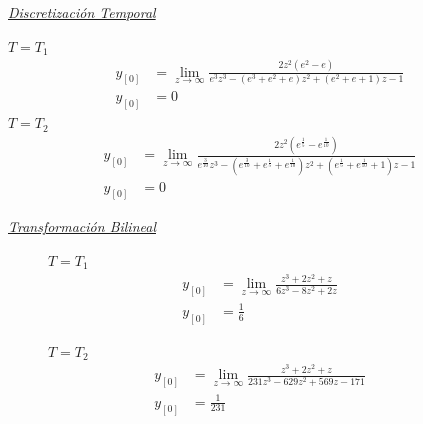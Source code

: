 \documentclass[a4paper,12pt]{report}
\begin{document}
\begin{enumerate}[label=\alph*), left=0pt]
                {\centering\underline{\textit{Discretización Temporal}}\par}
                $T = T_1$
                \begin{align*}
                    y_{[0]} &= \lim_{z \to \infty} \frac{2 z^2  (e^2 - e)}{e^3z^3-(e^3+e^2+e)z^2+(e^2+e+1)z-1}\\
                    y_{[0]} &= 0
                \end{align*}
                $T = T_2$
                \begin{align*}
                    y_{[0]} &= \lim_{z \to \infty} \frac{2 z^2 (e^{\frac{1}{5}} - e^{\frac{1}{10}})}
                        {e^{\frac{3}{10}}z^3 - (e^{\frac{3}{10}} + e^{\frac{1}{5}} + e^{\frac{1}{10}})z^2
                        + (e^{\frac{1}{5}} + e^{\frac{1}{10}} + 1)z - 1}\\
                    y_{[0]} &= 0
                \end{align*}

                {\centering\underline{\textit{Transformación Bilineal}}\par}
                \begin{figure}[h!]
                    \centering
                    \begin{minipage}{0.4\textwidth}
                        \centering
                        $T = T_1$
                        \begin{align*}
                            y_{[0]} &= \lim_{z \to \infty} \frac{z^3 + 2z^2 + z}{6z^3 - 8z^2 + 2z}\\
                            y_{[0]} &= \frac{1}{6}
                        \end{align*}
                    \end{minipage}
                    \hspace{0.5cm}
                    \begin{minipage}{0.4\textwidth}
                        \centering
                        $T = T_2$
                        \begin{align*}
                            y_{[0]} &= \lim_{z \to \infty} \frac{z^3 + 2z^2 + z}{231z^3 - 629z^2 + 569z - 171}\\
                            y_{[0]} &= \frac{1}{231}
                        \end{align*}
                    \end{minipage}
                \end{figure}


\end{enumerate}
\end{document}
